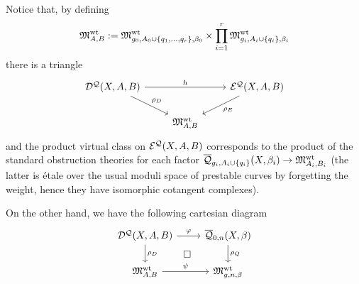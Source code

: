 Notice that, by defining
\begin{equation*} \mathfrak M_{A,B}^{\operatorname{wt}} := \mathfrak M_{g_0,A_0\cup\{q_1,\ldots,q_r\},\beta_0}^{\operatorname{wt}} \times \prod_{i=1}^r \mathfrak M_{g_i,A_i\cup\{q_i\},\beta_i}^{\operatorname{wt}} \end{equation*}
there is a triangle
\begin{equation}\label{D-E-triangle}
 \begin{tikzcd}
  \D{X}{A}{B} \ar[dr,"\rho_D"]\ar[rr,"h"] & & \E{X}{A}{B}\ar[dl,"\rho_E"] \\
& \MM_{A,B}^{\operatorname{wt}} &
 \end{tikzcd}
\end{equation}
and the product virtual class on $\mathcal{E^Q}(X,A,B)$ corresponds to the product of the standard obstruction theories for each factor $\overline{\mathcal Q}_{g_i,A_i\cup\{q_i\}}(X,\beta_i)\rightarrow \mathfrak M_{A_i,B_i}^{\operatorname{wt}}$ (the latter is \'etale over the usual moduli space of prestable curves by forgetting the weight, hence they have isomorphic cotangent complexes).

On the other hand, we have the following cartesian diagram
\begin{equation} \label{Full quasimap diagram}
\begin{tikzcd}
\D{X}{A}{B} \ar[r,"\varphi"] \ar[d,"\rho_D"] \ar[rd,phantom,"\square"] & \Q{0}{n}{X}{\beta} \ar[d,"\rho_Q"] \\
\MM_{A,B}^{\operatorname{wt}} \ar[r,"\psi"] & \MM_{g,n,\beta}^{\operatorname{wt}}
\end{tikzcd}
\end{equation}

